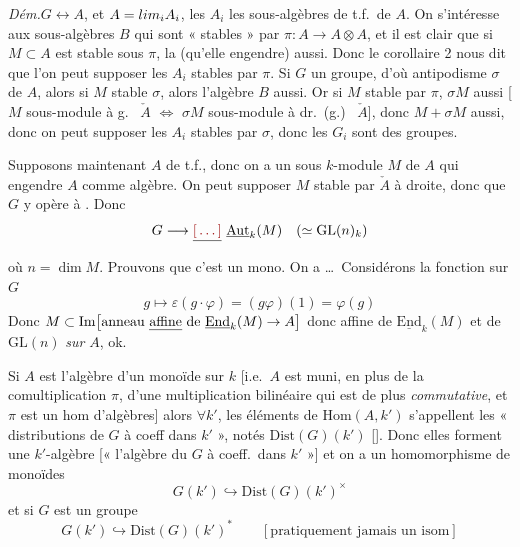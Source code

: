\documentclass[11pt,a4paper]{article}
\begin{document}
\emph{Dém.}\quad $G \longleftrightarrow A$, \struck{\ill{}} et $A = \varinjlim_i A_i$, les $A_i$ les sous-algèbres de t.f.\ de $A$. On s'intéresse aux sous-algèbres $B$ qui sont « stables » par $\pi : A \to A \otimes A$, et il est clair que si $M \subset A$ est stable sous $\pi$, la   (qu'elle engendre) aussi. Donc le corollaire 2 nous dit que l'on peut supposer les $A_i$ stables par $\pi$. Si $G$ un groupe, d'où antipodisme $\sigma$ de $A$, alors si $M$ stable  $\sigma$, alors l'algèbre $B$ aussi. Or si $M$ stable par $\pi$, $\sigma M$ aussi [$M$ sous-module à g.\   $\check{A}$ $\Longleftrightarrow$ $\sigma M$ sous-module à dr.\ (g.)\  $\check{A}$], donc $M + \sigma M$ aussi, donc on peut supposer les $A_i$ stables par $\sigma$, donc les $G_i$ sont des groupes.

Supposons maintenant $A$ de t.f., donc on a un sous $k$-module  $M$ de $A$ qui engendre $A$ comme \struck{\ill{}} algèbre.  On peut supposer $M$ stable par $\check{A}$ à  droite, donc que $G$ y opère à  . Donc
\[
  G \longrightarrow \struck{\ill{}}\ \underline{\mathrm{Aut}}_k(M) \quad (\simeq \mathrm{GL}(n)_k)
\]
où $n = \dim M$. Prouvons que c'est un mono. On a \struck{\ill{} \ill{}}  …\ Considérons  la fonction sur $G$
\[
  g \longmapsto \varepsilon(g \cdot \varphi) = (g\varphi)(1) = \varphi(g)
\]
\struck{\ill{}} Donc $M \subset \mathrm{Im}\bigl[\text{anneau \uncertain{affine} de } \underline{\mathrm{End}}_k(M) \to A\bigr]$
donc  affine de $\underline{\mathrm{End}}_k(M)$ et  de $\mathrm{GL}(n)$  \emph{sur} $A$, ok.

Si $A$ est l'algèbre  d'un monoïde  sur $k$ [i.e.\ $A$ est muni, en plus de la comultiplication $\pi$, d'une multiplication  bilinéaire   qui est de plus \emph{commutative}, et $\pi$ est un hom d'algèbres] alors $\forall k'$, les éléments de  $\mathrm{Hom}(A, k')$  \struck{\ill{}} s'appellent les « distributions de $G$ à \struck{\ill{}} coeff  dans $k'$ », notés $\mathrm{Dist}(G)(k')$ []. Donc  elles forment une $k'$-algèbre [« l'algèbre du   $G$ à coeff.\ dans $k'$ »] et on a un homomorphisme de monoïdes
\[
  G(k') \hookrightarrow \mathrm{Dist}(G)(k')^{\times}
\]
et si $G$ est un groupe
\[
  G(k') \hookrightarrow \mathrm{Dist}(G)(k')^{*} \qquad [\text{pratiquement jamais un isom}]
\]
\end{document}
